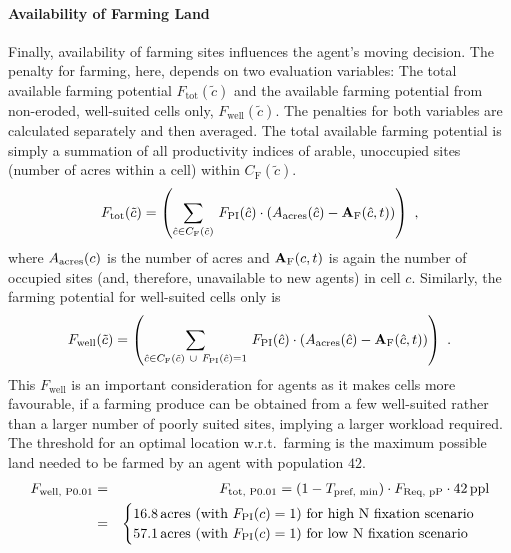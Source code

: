\paragraph{Availability of Farming Land}%
Finally, availability of farming sites influences the agent's moving decision.
The penalty for farming, here, depends on two evaluation variables: 
The total available farming potential $F_\text{tot}(\tilde{c})$ and the available farming potential from non-eroded, well-suited cells only, $F_\text{well}(\tilde{c})$.
The penalties for both variables are calculated separately and then averaged.
The total available farming potential is simply a summation of all productivity indices of arable, unoccupied sites (number of acres within a cell) within $C_\text{F}(\tilde{c})$.
\begin{equation}
	F_\text{tot}(\tilde{c}) = \left( \sum_{\hat{c} \in C_{\rm F}(\tilde{c}) }\, F_{\rm PI}(\hat{c}) \cdot (A_{\rm acres}(\hat{c})  - \mathbf{A}_{\rm F}(\hat{c}, t) )\right) \ ,
\end{equation}
where $A_{\rm acres}(c)$ is the number of acres and $ \mathbf{A}_{\rm F}(c,t)$ is again the number of occupied sites (and, therefore, unavailable to new agents) in cell $c$.
Similarly, the farming potential for well-suited cells only is 
\begin{equation}
	F_\text{well}(\tilde{c}) = \left( \sum_{\hat{c} \in C_{\rm F}(\tilde{c}) \ \cup \ F_{\rm PI}(\hat{c})=1} \, F_{\rm PI}(\hat{c}) \cdot (A_{\rm acres}(\hat{c})  - \mathbf{A}_{\rm F}(\hat{c},t) )\right) \ .
\end{equation}
This $F_\text{well}$ is an important consideration for agents as it makes cells more favourable, if a farming produce can be obtained from a few well-suited rather than a larger number of poorly suited sites, implying a larger workload required.
The threshold for an optimal location w.r.t.\ farming is the maximum possible land needed to be farmed by an agent with population $42$.
\begin{eqnarray}
F_\text{well, P0.01} & = & F_\text{tot, P0.01} =  (1-T_\text{pref, min})\cdot F_\text{Req, pP} \cdot 42\, {\rm ppl}  \\
& = & 
\begin{cases} 16.8\, {\rm acres}  \text{ (with }F_{\rm PI}(c)=1\text{) for high N fixation scenario} \\  57.1 \, {\rm acres} \text{ (with }F_{\rm PI}(c)=1\text{) for low N fixation scenario} \nonumber
\end{cases} 
\end{eqnarray}
